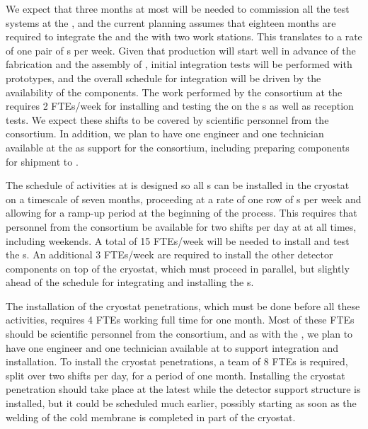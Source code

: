 We expect that three months at most will be needed to commission
all the test systems at the , and the current planning
assumes that eighteen months are required to integrate the 
and the  with two work stations. This translates to
a rate of one pair of s per week. Given that 
production will start well in advance of the  fabrication
and the assembly of , initial integration tests will 
be performed with  prototypes, and the overall schedule
for integration will be driven by the availability of the 
components. The work performed by the 
consortium at the  requires 2 FTEs/week for installing and testing
the  on the s as well as  
 reception tests. We expect these shifts to be covered 
by scientific personnel from the  consortium. In addition, 
we plan to have one engineer and one technician available at the 
 as support for the consortium, including 
preparing components for shipment to .

The schedule of activities at  is designed so all 
s can be installed in the cryostat on a timescale of seven
months, proceeding at a rate of one row of s per week and allowing
for a ramp-up period at the beginning of the process. This
requires that personnel from the  consortium be available
for two shifts per day at  at all times, including weekends. A
total of 15 FTEs/week will be needed to install and test the s. An additional 3 FTEs/week are
required to install the other detector components on
top of the cryostat, which must proceed in parallel, but slightly
ahead of the schedule for integrating and installing the
s. 

The installation of the cryostat penetrations, which must be done before all these activities, requires 4 FTEs working full time
for one month. Most of these FTEs should be scientific personnel from
the  consortium, and as with the , we plan
to have one engineer and one technician available at to support
integration and installation. To install
the cryostat penetrations, a team of 8 FTEs is required, split over
two shifts per day, for a period of one month. Installing
the cryostat penetration should take place at the latest while the 
detector support structure is installed, but it could be
scheduled much earlier, possibly starting as soon
as the welding of the cold membrane is completed in part of the cryostat.


